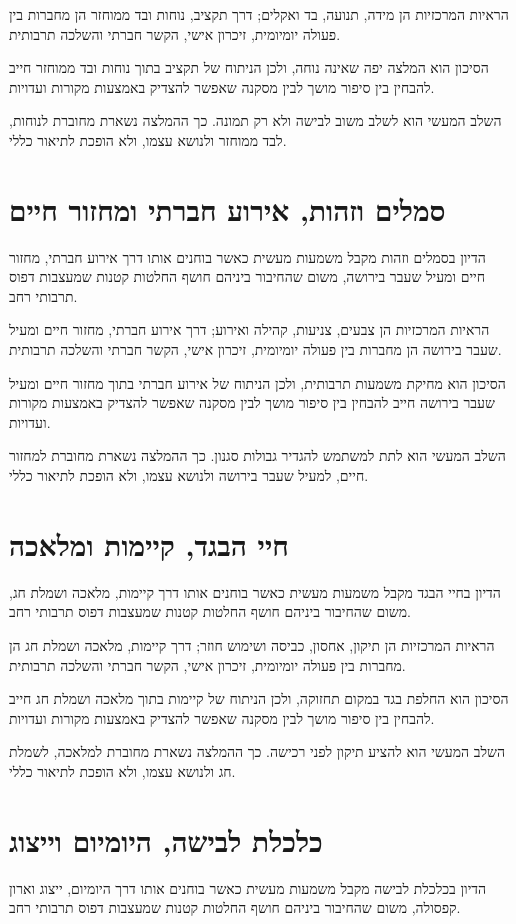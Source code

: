 הראיות המרכזיות הן מידה, תנועה, בד ואקלים; דרך תקציב, נוחות ובד ממוחזר הן מחברות בין פעולה יומיומית, זיכרון אישי, הקשר חברתי והשלכה תרבותית.

הסיכון הוא המלצה יפה שאינה נוחה, ולכן הניתוח של תקציב בתוך נוחות ובד ממוחזר חייב להבחין בין סיפור מושך לבין מסקנה שאפשר להצדיק באמצעות מקורות ועדויות.

השלב המעשי הוא לשלב משוב לבישה ולא רק תמונה. כך ההמלצה נשארת מחוברת לנוחות, לבד ממוחזר ולנושא עצמו, ולא הופכת לתיאור כללי.

\section{סמלים וזהות, אירוע חברתי ומחזור חיים}
הדיון בסמלים וזהות מקבל משמעות מעשית כאשר בוחנים אותו דרך אירוע חברתי, מחזור חיים ומעיל שעבר בירושה, משום שהחיבור ביניהם חושף החלטות קטנות שמעצבות דפוס תרבותי רחב.

הראיות המרכזיות הן צבעים, צניעות, קהילה ואירוע; דרך אירוע חברתי, מחזור חיים ומעיל שעבר בירושה הן מחברות בין פעולה יומיומית, זיכרון אישי, הקשר חברתי והשלכה תרבותית.

הסיכון הוא מחיקת משמעות תרבותית, ולכן הניתוח של אירוע חברתי בתוך מחזור חיים ומעיל שעבר בירושה חייב להבחין בין סיפור מושך לבין מסקנה שאפשר להצדיק באמצעות מקורות ועדויות.

השלב המעשי הוא לתת למשתמש להגדיר גבולות סגנון. כך ההמלצה נשארת מחוברת למחזור חיים, למעיל שעבר בירושה ולנושא עצמו, ולא הופכת לתיאור כללי.

\section{חיי הבגד, קיימות ומלאכה}
הדיון בחיי הבגד מקבל משמעות מעשית כאשר בוחנים אותו דרך קיימות, מלאכה ושמלת חג, משום שהחיבור ביניהם חושף החלטות קטנות שמעצבות דפוס תרבותי רחב.

הראיות המרכזיות הן תיקון, אחסון, כביסה ושימוש חוזר; דרך קיימות, מלאכה ושמלת חג הן מחברות בין פעולה יומיומית, זיכרון אישי, הקשר חברתי והשלכה תרבותית.

הסיכון הוא החלפת בגד במקום תחזוקה, ולכן הניתוח של קיימות בתוך מלאכה ושמלת חג חייב להבחין בין סיפור מושך לבין מסקנה שאפשר להצדיק באמצעות מקורות ועדויות.

השלב המעשי הוא להציע תיקון לפני רכישה. כך ההמלצה נשארת מחוברת למלאכה, לשמלת חג ולנושא עצמו, ולא הופכת לתיאור כללי.

\section{כלכלת לבישה, היומיום וייצוג}
הדיון בכלכלת לבישה מקבל משמעות מעשית כאשר בוחנים אותו דרך היומיום, ייצוג וארון קפסולה, משום שהחיבור ביניהם חושף החלטות קטנות שמעצבות דפוס תרבותי רחב.

